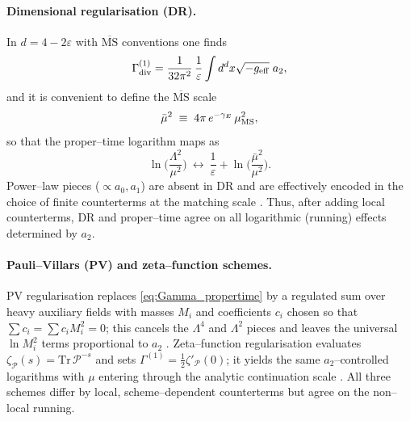\documentclass{iopjournal}
\begin{document}
\paragraph{Dimensional regularisation (DR).}
In $d=4-2\varepsilon$ with $\overline{\mathrm{MS}}$ conventions one finds
\begin{equation}
\Gamma^{(1)}_{\rm div}
=\frac{1}{32\pi^2}\,\frac{1}{\varepsilon}\int d^dx\sqrt{-g_{\rm eff}}\;a_2,
\label{eq:DR_div}
\end{equation}
and it is convenient to define the $\overline{\mathrm{MS}}$ scale
\begin{equation}
\bar\mu^2 \;\equiv\; 4\pi\,e^{-\gamma_E}\,\mu_{\rm MS}^2,
\label{eq:muMSbar}
\end{equation}
so that the proper–time logarithm maps as
\begin{equation}
\ln\!\Big(\frac{\Lambda^2}{\mu^2}\Big)\ \longleftrightarrow\
\frac{1}{\varepsilon}+\ln\!\Big(\frac{\bar\mu^2}{\mu^2}\Big).
\label{eq:PT_to_DR_map}
\end{equation}
Power–law pieces ($\propto a_0,a_1$) are absent in DR and are effectively encoded in the choice of finite counterterms at the matching scale \cite{ParkerToms}. Thus, after adding local counterterms, DR and proper–time agree on all logarithmic (running) effects determined by $a_2$.




\paragraph{Pauli–Villars (PV) and zeta–function schemes.}
PV regularisation replaces \eqref{eq:Gamma_propertime} by a regulated sum over heavy auxiliary fields with masses $M_i$ and coefficients $c_i$ chosen so that $\sum c_i=\sum c_i M_i^2=0$; this cancels the $\Lambda^4$ and $\Lambda^2$ pieces and leaves the universal $\ln M_i^2$ terms proportional to $a_2$ \cite[Ch.~3]{ParkerToms}. Zeta–function regularisation evaluates $\zeta_{\mathcal{P}}(s)=\mathrm{Tr}\,\mathcal{P}^{-s}$ and sets $\Gamma^{(1)}=\tfrac{1}{2}\zeta'_{\mathcal{P}}(0)$; it yields the same $a_2$–controlled logarithms with $\mu$ entering through the analytic continuation scale \cite[\S2]{Vassilevich2003}. All three schemes differ by local, scheme–dependent counterterms but agree on the non–local running.
\end{document}
